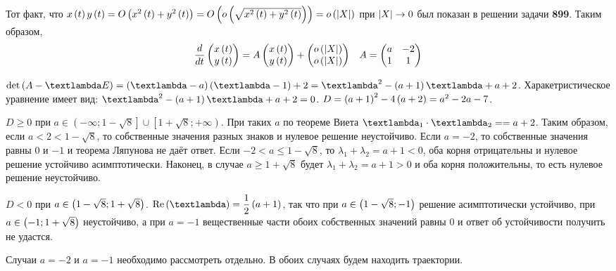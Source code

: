 \documentclass[a5paper,10pt]{article}
\begin{document}
Тот факт, что
$x\left(t\right) y\left(t\right) = O\left(x^2\left(t\right) + y^2\left(t\right)\right) = O\left(o\left(\sqrt{x^2\left(t\right) + y^2\left(t\right)}\right)\right) = o\left(\left|X\right|\right)$ при $\left|X\right| \to 0$
был показан в решении задачи \textbf{899}. Таким образом,
\begin{align*} 
    \dfrac {d} {dt} \begin{pmatrix} x\left(t\right) \\ y\left(t\right) \end{pmatrix} = A \begin{pmatrix} x\left(t\right) \\ y\left(t\right) \end{pmatrix} + \begin{pmatrix} o\left(\left|X\right|\right) \\ o\left(\left|X\right|\right) \end{pmatrix} && A = \begin{pmatrix} a & -2 \\ 1 & 1 \end{pmatrix}
\end{align*}

$\det\br{A - \lambda E} = \br{\lambda - a}\br{\lambda - 1} + 2 = \lambda^2 - \br{a + 1} \lambda + a + 2$. Харакетристическое уравнение имеет вид:
$\lambda^2 - \br{a + 1} \lambda + a + 2 = 0$. $D = \left(a + 1\right)^2 - 4\left(a + 2\right) = a^2 - 2a - 7$.

$D \ge 0$ при $a \in \left(-\infty; 1 - \sqrt{8} \right] \cup \left[1 + \sqrt{8}; +\infty \right)$. При таких $a$ по теореме Виета $\lambda_{1} \cdot \lambda_{2} = \linebreak = a + 2$. Таким образом, если $a < 2 < 1 - \sqrt{8}$, то собственные значения разных знаков и нулевое решение неустойчиво. Если $a = -2$, то собственные значения равны $0$ и $-1$ и теорема Ляпунова не даёт ответ. Если $-2 < a \le 1 - \sqrt{8}$, то $\lambda_{1} + \lambda_{2} = a + 1 < 0$, оба корня отрицательны и нулевое решение устойчиво асимптотически. Наконец, в случае $a \ge 1 + \sqrt{8}$ будет $\lambda_{1} + \lambda_{2} = a + 1 > 0$ и оба корня положительны, то есть нулевое решение неустойчиво.

$D < 0$ при $a \in \left(1 - \sqrt{8}; 1 + \sqrt{8}\right)$. $\Re\br{\lambda} = \dfrac {1} {2} \br{a + 1}$, так что при $a \in \left(1 - \sqrt{8}; -1\right)$ решение асимптотически устойчиво, при $a \in \left(-1; 1 + \sqrt{8}\right)$ неустойчиво, а при $a = -1$ вещественные части обоих собственных значений равны $0$ и ответ об устойчивости получить не удастся.

Случаи $a = -2$ и $a = -1$ необходимо рассмотреть отдельно. В обоих случаях будем находить траектории.
\end{document}
